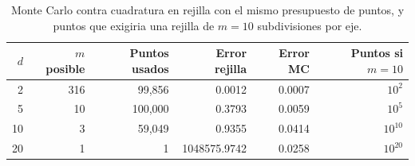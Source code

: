\begin{table}[htbp]\centering
\caption{Monte Carlo contra cuadratura en rejilla con el mismo presupuesto de puntos, y puntos que exigiria una rejilla de $m=10$ subdivisiones por eje.}
\label{tab:rejilla}
\small
\begin{tabular}{r|r|r|r|r|r}
\toprule
$d$ & $m$ posible & Puntos usados & Error rejilla & Error MC & Puntos si $m=10$ \\
\midrule
2 & 316 & 99{,}856 & 0.0012 & 0.0007 & $10^{2}$ \\
5 & 10 & 100{,}000 & 0.3793 & 0.0059 & $10^{5}$ \\
10 & 3 & 59{,}049 & 0.9355 & 0.0414 & $10^{10}$ \\
20 & 1 & 1 & 1048575.9742 & 0.0258 & $10^{20}$ \\
\bottomrule
\end{tabular}
\end{table}
